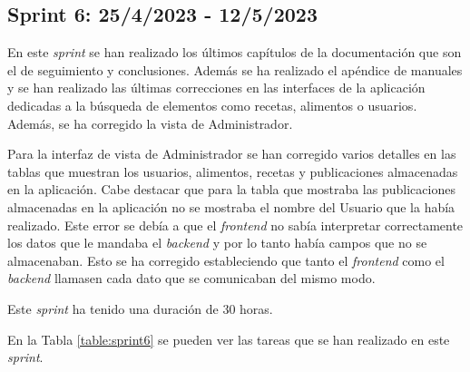 \subsection{Sprint 6: 25/4/2023 - 12/5/2023}
En este \textit{sprint} se han realizado los últimos capítulos de la documentación que son el de seguimiento y conclusiones. Además se ha realizado el apéndice de manuales y se han realizado las últimas correcciones en las interfaces de la aplicación dedicadas a la búsqueda de elementos como recetas, alimentos o usuarios. Además, se ha corregido la vista de Administrador.

Para la interfaz de vista de Administrador se han corregido varios detalles en las tablas que muestran los usuarios, alimentos, recetas y publicaciones almacenadas en la aplicación. Cabe destacar que para la tabla que mostraba las publicaciones almacenadas en la aplicación no se mostraba el nombre del Usuario que la había realizado. Este error se debía a que el \textit{frontend} no sabía interpretar correctamente los datos que le mandaba el \textit{backend} y por lo tanto había campos que no se almacenaban. Esto se ha corregido estableciendo que tanto el \textit{frontend} como el \textit{backend} llamasen cada dato que se comunicaban del mismo modo.

Este \textit{sprint} ha tenido una duración de 30 horas.

En la Tabla \ref{table:sprint6} se pueden ver las tareas que se han realizado en este \textit{sprint}.

